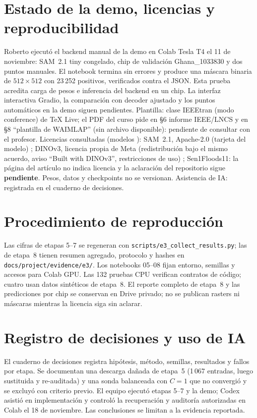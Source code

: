 \documentclass[conference]{IEEEtran}
\begin{document}
\section{Estado de la demo, licencias y reproducibilidad}
Roberto ejecutó el backend manual de la demo en Colab Tesla T4 el 11 de noviembre: SAM~2.1 tiny congelado, chip de validación Ghana\_1033830 y dos puntos manuales. El notebook termina sin errores y produce una máscara binaria de $512\times512$ con 23\,252 positivos, verificados contra el JSON. Esta prueba acredita carga de pesos e inferencia del backend en un chip. La interfaz interactiva Gradio, la comparación con decoder ajustado y los puntos automáticos en la demo siguen pendientes. Plantilla: clase IEEEtran (modo conference) de TeX Live; el PDF del curso pide en \S6 informe IEEE/LNCS y en \S8 ``plantilla de WAIMLAP'' (sin archivo disponible): pendiente de consultar con el profesor. Licencias consultadas (modelos \cite{dino-model}): SAM~2.1, Apache-2.0 (tarjeta del modelo) \cite{sam-model}; DINOv3, licencia propia de Meta (redistribuci\'on bajo el mismo acuerdo, aviso ``Built with DINOv3'', restricciones de uso) \cite{dinov3license}; Sen1Floods11: la p\'agina del art\'iculo no indica licencia y la aclaraci\'on del repositorio sigue \textbf{pendiente}. Pesos, datos y checkpoints no se versionan. Asistencia de IA: registrada en el cuaderno de decisiones.

\section{Procedimiento de reproducci\'on}
Las cifras de etapas 5--7 se regeneran con \texttt{scripts/e3\_collect\_results.py}; las de etapa~8 tienen resumen agregado, protocolo y hashes en \texttt{docs/project/evidence/e3/}. Los notebooks 05--08 fijan entorno, semillas y accesos para Colab GPU. Las 132 pruebas CPU verifican contratos de c\'odigo; cuatro usan datos sint\'eticos de etapa~8. El reporte completo de etapa~8 y las predicciones por chip se conservan en Drive privado; no se publican rasters ni m\'ascaras mientras la licencia siga sin aclarar.

\section{Registro de decisiones y uso de IA}
El cuaderno de decisiones registra hip\'otesis, m\'etodo, semillas, resultados y fallos por etapa. Se documentan una descarga da\~nada de etapa~5 (1\,067 entradas, luego sustituida y re-auditada) y una sonda balanceada con $C=1$ que no convergi\'o y se excluy\'o con criterio previo. El equipo ejecut\'o etapas 5--7 y la demo; Codex asisti\'o en implementaci\'on y control\'o la recuperaci\'on y auditor\'ia autorizadas en Colab el 18 de noviembre. Las conclusiones se limitan a la evidencia reportada.
\end{document}
